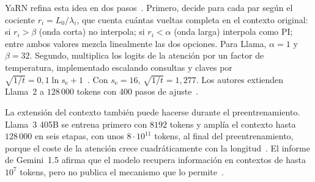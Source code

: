 YaRN refina esta idea en dos pasos~\cite[§3.2 y §3.3]{yarn}. Primero, decide para cada par según el cociente $r_i=L_0/\lambda_i$, que cuenta cuántas vueltas completa en el contexto original: si $r_i>\beta$ (onda corta) no interpola; si $r_i<\alpha$ (onda larga) interpola como PI; entre ambos valores mezcla linealmente las dos opciones. Para Llama, $\alpha=1$ y $\beta=32$. Segundo, multiplica los logits de la atención por un factor de temperatura, implementado escalando consultas y claves por $\sqrt{1/t}=0{,}1\ln s_{\mathrm{e}}+1$~\cite[§3.3]{yarn}. Con $s_{\mathrm{e}}=16$, $\sqrt{1/t}=1{,}277$. Los autores extienden Llama~2 a $128\,000$ tokens con 400 pasos de ajuste~\cite[§4.1]{yarn}.

\addtocounter{definicion}{1}%

\begin{observacion}
La extensión del contexto también puede hacerse durante el preentrenamiento. Llama~3 405B se entrena primero con $8192$ tokens y amplía el contexto hasta $128\,000$ en seis etapas, con unos $8\cdot 10^{11}$ tokens, al final del preentrenamiento, porque el coste de la atención crece cuadráticamente con la longitud~\cite[§3.4.2]{llama3}. El informe de Gemini~1.5 afirma que el modelo recupera información en contextos de hasta $10^{7}$ tokens, pero no publica el mecanismo que lo permite~\cite[§3.1]{gemini15}.
\end{observacion}


